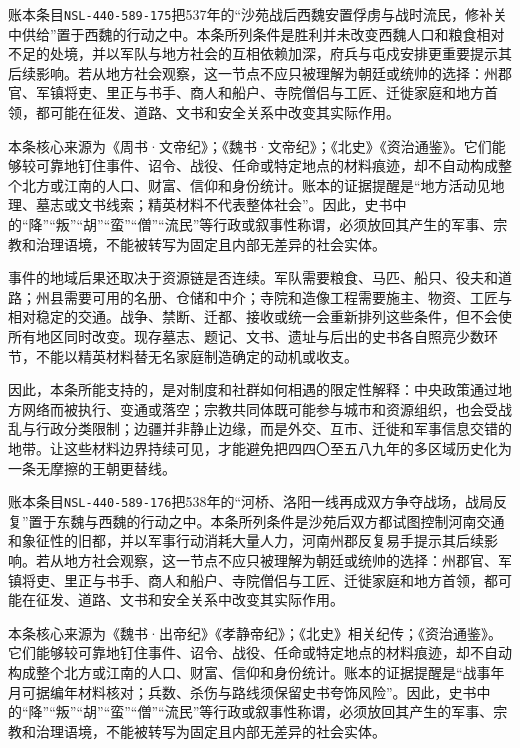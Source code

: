 账本条目\texttt{NSL-440-589-175}把537年的“沙苑战后西魏安置俘虏与战时流民，修补关中供给”置于西魏的行动之中。本条所列条件是胜利并未改变西魏人口和粮食相对不足的处境，并以军队与地方社会的互相依赖加深，府兵与屯戍安排更重要提示其后续影响。若从地方社会观察，这一节点不应只被理解为朝廷或统帅的选择：州郡官、军镇将吏、里正与书手、商人和船户、寺院僧侣与工匠、迁徙家庭和地方首领，都可能在征发、道路、文书和安全关系中改变其实际作用。

本条核心来源为《周书·文帝纪》；《魏书·文帝纪》；《北史》《资治通鉴》。它们能够较可靠地钉住事件、诏令、战役、任命或特定地点的材料痕迹，却不自动构成整个北方或江南的人口、财富、信仰和身份统计。账本的证据提醒是“地方活动见地理、墓志或文书线索；精英材料不代表整体社会”。因此，史书中的“降”“叛”“胡”“蛮”“僧”“流民”等行政或叙事性称谓，必须放回其产生的军事、宗教和治理语境，不能被转写为固定且内部无差异的社会实体。

事件的地域后果还取决于资源链是否连续。军队需要粮食、马匹、船只、役夫和道路；州县需要可用的名册、仓储和中介；寺院和造像工程需要施主、物资、工匠与相对稳定的交通。战争、禁断、迁都、接收或统一会重新排列这些条件，但不会使所有地区同时改变。现存墓志、题记、文书、遗址与后出的史书各自照亮少数环节，不能以精英材料替无名家庭制造确定的动机或收支。

因此，本条所能支持的，是对制度和社群如何相遇的限定性解释：中央政策通过地方网络而被执行、变通或落空；宗教共同体既可能参与城市和资源组织，也会受战乱与行政分类限制；边疆并非静止边缘，而是外交、互市、迁徙和军事信息交错的地带。让这些材料边界持续可见，才能避免把四四〇至五八九年的多区域历史化为一条无摩擦的王朝更替线。

账本条目\texttt{NSL-440-589-176}把538年的“河桥、洛阳一线再成双方争夺战场，战局反复”置于东魏与西魏的行动之中。本条所列条件是沙苑后双方都试图控制河南交通和象征性的旧都，并以军事行动消耗大量人力，河南州郡反复易手提示其后续影响。若从地方社会观察，这一节点不应只被理解为朝廷或统帅的选择：州郡官、军镇将吏、里正与书手、商人和船户、寺院僧侣与工匠、迁徙家庭和地方首领，都可能在征发、道路、文书和安全关系中改变其实际作用。

本条核心来源为《魏书·出帝纪》《孝静帝纪》；《北史》相关纪传；《资治通鉴》。它们能够较可靠地钉住事件、诏令、战役、任命或特定地点的材料痕迹，却不自动构成整个北方或江南的人口、财富、信仰和身份统计。账本的证据提醒是“战事年月可据编年材料核对；兵数、杀伤与路线须保留史书夸饰风险”。因此，史书中的“降”“叛”“胡”“蛮”“僧”“流民”等行政或叙事性称谓，必须放回其产生的军事、宗教和治理语境，不能被转写为固定且内部无差异的社会实体。

